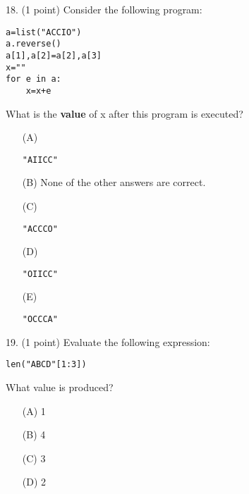 \documentclass{article}
\begin{document}
\noindent
\begin{minipage}{\textwidth}
18. (1 point)
Consider the following program:
\begin{verbatim}
a=list("ACCIO")
a.reverse()
a[1],a[2]=a[2],a[3]
x=""
for e in a:
    x=x+e
\end{verbatim}
What is the \textbf{value} of x after this program is executed?

\begin{enumerate}
\item[(A)]
\begin{verbatim}"AIICC"\end{verbatim}

\item[(B)]
None of the other answers are correct.

\item[(C)]
\begin{verbatim}"ACCCO"\end{verbatim}

\item[(D)]
\begin{verbatim}"OIICC"\end{verbatim}

\item[(E)]
\begin{verbatim}"OCCCA"\end{verbatim}

\end{enumerate}
\end{minipage}
\vspace{10em}
\filbreak\vfil{}\vfilneg

\noindent
\begin{minipage}{\textwidth}
19. (1 point)
Evaluate the following expression:
\begin{verbatim}
len("ABCD"[1:3])
\end{verbatim}
What value is produced?

\begin{enumerate}
\item[(A)]
1

\item[(B)]
4

\item[(C)]
3

\item[(D)]
2

\end{enumerate}
\end{minipage}
\vspace{10em}
\filbreak\vfil{}\vfilneg
\end{document}
